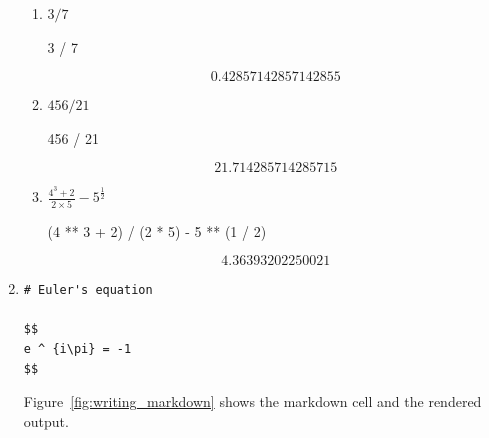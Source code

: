 \begin{enumerate}
\begin{enumerate}
            \item \(3 / 7\)
            \begin{pyin}
3 / 7
                \end{pyin}
                \[0.42857142857142855\]

            \item \(456 / 21\)
            \begin{pyin}
456 / 21
                \end{pyin}
                \[21.714285714285715\]

            \item \(\frac{4 ^ 3 + 2}{2\times 5} - 5 ^ {\frac{1}{2}}\)

            \begin{pyin}
(4 ** 3 + 2) / (2 * 5) - 5 ** (1 / 2)
                \end{pyin}
                \[4.36393202250021\]
        \end{enumerate}

    \item 

    \begin{verbatim}
# Euler's equation

$$
e ^ {i\pi} = -1
$$
    \end{verbatim}

    Figure~\ref{fig:writing_markdown} shows the markdown cell and the rendered
    output.


\end{enumerate}
